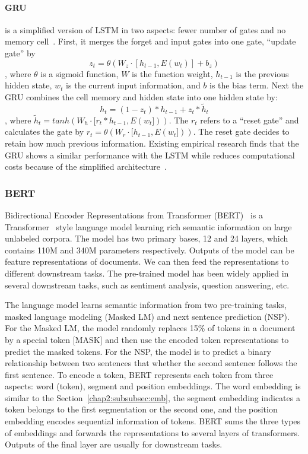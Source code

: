 \paragraph{GRU} is a simplified version of LSTM in two aspects: fewer number of gates and no memory cell~\cite{chung2014empirical}.
First, it merges the forget and input gates into one gate, ``update gate'' by
$$z_t = \theta(W_z \cdot [h_{t-1}, E(w_t)] + b_z)$$
, where $\theta$ is a sigmoid function, $W$ is the function weight, $h_{t-1}$ is the previous hidden state, $w_t$ is the current input information, and $b$ is the bias term.
Next the GRU combines the cell memory and hidden state into one hidden state by:
$$h_t = (1-z_t) * h_{t-1} + z_t * \tilde{h}_t$$
, where $\tilde{h}_t = tanh(W_h \cdot [r_t * h_{t-1}, E(w_t]))$.
The $r_t$ refers to a ``reset gate'' and calculates the gate by $r_t = \theta(W_r \cdot [h_{t-1}, E(w_t]))$.
The reset gate decides to retain how much previous information.
Existing empirical research finds that the GRU shows a similar performance with the LSTM while reduces computational costs because of the simplified architecture~\cite{chung2014empirical}.


\subsubsection{BERT} 
Bidirectional Encoder Representations from Transformer (BERT)~\cite{devlin2019bert} is a Transformer~\cite{vaswani2017attention} style language model learning rich semantic information on large unlabeled corpora.
The model has two primary bases, 12 and 24 layers, which contains 110M and 340M parameters respectively.
Outputs of the model can be feature representations of documents.
We can then feed the representations to different downstream tasks.
The pre-trained model has been widely applied in several downstream tasks, such as sentiment analysis, question answering, etc.

The language model learns semantic information from two pre-training tasks, masked language modeling (Masked LM) and next sentence prediction (NSP). 
For the Masked LM, the model randomly replaces 15\% of tokens in a document by a special token [MASK] and then use the encoded token representations to predict the masked tokens.
For the NSP, the model is to predict a binary relationship between two sentences that whether the second sentence follows the first sentence.
To encode a token, BERT represents each token from three aspects: word (token), segment and position embeddings.
The word embedding is similar to the Section~\ref{chap2:subsubsec:emb}, the segment embedding indicates a token belongs to the first segmentation or the second one, and the position embedding encodes sequential information of tokens.
BERT sums the three types of embeddings and forwards the representations to several layers of transformers.
Outputs of the final layer are usually for downstream tasks.


